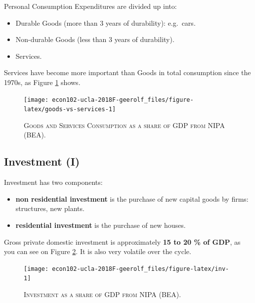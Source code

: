 \documentclass[]{book}
\providecommand{\tightlist}{%
  \setlength{\itemsep}{0pt}\setlength{\parskip}{0pt}}
\theoremstyle{definition}
\theoremstyle{definition}
\theoremstyle{definition}
\theoremstyle{remark}
\begin{document}
Personal Consumption Expenditures are divided up into:

\begin{itemize}
\tightlist
\item
  Durable Goods (more than 3 years of durability): e.g.~cars.
\item
  Non-durable Goods (less than 3 years of durability).
\item
  Services.
\end{itemize}

Services have become more important than Goods in total consumption
since the 1970s, as Figure \ref{fig:goods-vs-services} shows.




\begin{figure}

{\centering \texttt{[image: econ102-ucla-2018F-geerolf\_files/figure-latex/goods-vs-services-1]} 

}

\caption{\textsc{Goods and Services Consumption as
a share of GDP from NIPA (BEA)}.}\label{fig:goods-vs-services}
\end{figure}

\subsection{Investment (I)}\label{inv}

Investment has two components:

\begin{itemize}
\tightlist
\item
  \textbf{non residential investment} is the purchase of new capital
  goods by firms: structures, new plants.
\item
  \textbf{residential investment} is the purchase of new houses.
\end{itemize}

Gross private domestic investment is approximately \textbf{15 to 20 \%
of GDP}, as you can see on Figure \ref{fig:inv}. It is also very
volatile over the cycle.



\begin{figure}

{\centering \texttt{[image: econ102-ucla-2018F-geerolf\_files/figure-latex/inv-1]} 

}

\caption{\textsc{Investment as a share of GDP from NIPA (BEA)}.}\label{fig:inv}
\end{figure}
\end{document}
